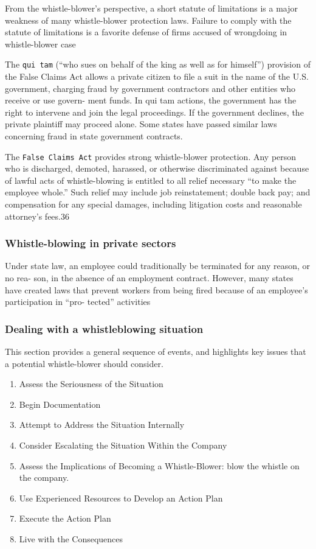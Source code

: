 \documentclass[11pt]{article}
\begin{document}
From the whistle-blower’s perspective, a short statute of limitations is a major weakness of many whistle-blower protection laws. Failure to comply with the statute of limitations is a favorite defense of firms accused of wrongdoing in whistle-blower case

The \texttt{qui tam} (“who sues on behalf of the king as well as for himself”) provision of the False Claims Act allows a private citizen to file a suit in the name of the U.S. government, charging fraud by government contractors and other entities who receive or use govern- ment funds. In qui tam actions, the government has the right to intervene and join the legal proceedings. If the government declines, the private plaintiff may proceed alone. Some states have passed similar laws concerning fraud in state government contracts.

The \texttt{False Claims Act} provides strong whistle-blower protection. Any person who is discharged, demoted, harassed, or otherwise discriminated against because of lawful acts of whistle-blowing is entitled to all relief necessary “to make the employee whole.” Such relief may include job reinstatement; double back pay; and compensation for any special damages, including litigation costs and reasonable attorney’s fees.36
\subsubsection{Whistle-blowing in private sectors}
\label{sec:orga765e6a}
Under state law, an employee could traditionally be terminated for any reason, or no rea-
son, in the absence of an employment contract. However, many states have created laws
that prevent workers from being fired because of an employee’s participation in “pro-
tected” activities

\subsubsection{Dealing with a whistleblowing situation}
\label{sec:orgb627b6b}
This section provides a general sequence of events, and highlights key issues that a potential whistle-blower should consider.
\begin{enumerate}
\item Assess the Seriousness of the Situation
\item Begin Documentation
\item Attempt to Address the Situation Internally
\item Consider Escalating the Situation Within the Company
\item Assess the Implications of Becoming a Whistle-Blower: blow the whistle on the company.
\item Use Experienced Resources to Develop an Action Plan
\item Execute the Action Plan
\item Live with the Consequences
\end{enumerate}
\end{document}
